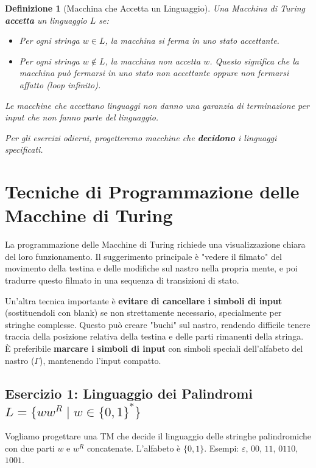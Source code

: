 \documentclass[a4paper]{article}
\newtheorem{definition}{Definizione}
\begin{document}
\begin{definition}[Macchina che Accetta un Linguaggio]
Una Macchina di Turing \textbf{accetta} un linguaggio $L$ se:
\begin{itemize}
    \item Per ogni stringa $w \in L$, la macchina si ferma in uno stato accettante.
    \item Per ogni stringa $w \notin L$, la macchina non accetta $w$. Questo significa che la macchina può fermarsi in uno stato non accettante oppure non fermarsi affatto (loop infinito).
\end{itemize}
Le macchine che accettano linguaggi non danno una garanzia di terminazione per input che non fanno parte del linguaggio.

Per gli esercizi odierni, progetteremo macchine che \textbf{decidono} i linguaggi specificati.
\end{definition}

\section{Tecniche di Programmazione delle Macchine di Turing}

La programmazione delle Macchine di Turing richiede una visualizzazione chiara del loro funzionamento. Il suggerimento principale è "vedere il filmato" del movimento della testina e delle modifiche sul nastro nella propria mente, e poi tradurre questo filmato in una sequenza di transizioni di stato.

Un'altra tecnica importante è \textbf{evitare di cancellare i simboli di input} (sostituendoli con blank) se non strettamente necessario, specialmente per stringhe complesse. Questo può creare "buchi" sul nastro, rendendo difficile tenere traccia della posizione relativa della testina e delle parti rimanenti della stringa. È preferibile \textbf{marcare i simboli di input} con simboli speciali dell'alfabeto del nastro ($\Gamma$), mantenendo l'input compatto.

\subsection{Esercizio 1: Linguaggio dei Palindromi $L = \{ww^R \mid w \in \{0,1\}^*\}$}

Vogliamo progettare una TM che decide il linguaggio delle stringhe palindromiche con due parti $w$ e $w^R$ concatenate. L'alfabeto è $\{0,1\}$. Esempi: $\varepsilon$, $00$, $11$, $0110$, $1001$.
\end{document}
